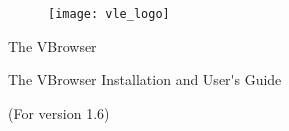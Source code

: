 %
% 

\begin{center}
\begin{figure}[htbp]
\centerline{\texttt{[image: vle\_logo]}}
\end{figure}

\vspace{5cm} 

{\Large The VBrowser}\\ 

\vspace{1cm} 
 
{\Huge The VBrowser Installation and User\'{}s Guide}\\ 

\vspace{1cm} 

{(For version 1.6)}\\
\vspace{0.5cm} 
\vspace{0.5cm} 

\\
\\
\end{center}


